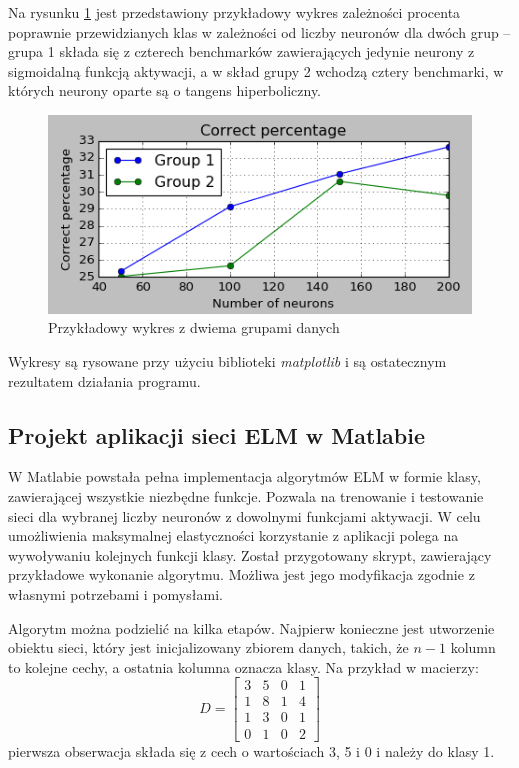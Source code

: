 \documentclass{article}
\begin{document}
Na rysunku \ref{przykladowy} jest przedstawiony przykładowy wykres zależności procenta poprawnie przewidzianych klas w zależności od liczby neuronów dla dwóch grup -- grupa 1 składa się z czterech benchmarków zawierających jedynie neurony z sigmoidalną funkcją aktywacji, a w skład grupy 2 wchodzą cztery benchmarki, w których neurony oparte są o tangens hiperboliczny. 
 
\begin{figure}[H]
\includegraphics[width=\textwidth]{przykladowy_wykres.png}
\caption{Przykładowy wykres z dwiema grupami danych}
\label{przykladowy}
\end{figure}


Wykresy są rysowane przy użyciu biblioteki \textit{matplotlib} i są ostatecznym rezultatem działania programu.

\subsection{Projekt aplikacji sieci ELM w Matlabie}
W Matlabie powstała pełna implementacja algorytmów ELM w formie klasy, zawierającej wszystkie niezbędne funkcje.
Pozwala na trenowanie i testowanie sieci dla wybranej liczby neuronów z dowolnymi funkcjami aktywacji. 
W celu umożliwienia maksymalnej elastyczności korzystanie z aplikacji polega na wywoływaniu kolejnych funkcji klasy.
Został przygotowany skrypt, zawierający przykładowe wykonanie algorytmu.
Możliwa jest jego modyfikacja zgodnie z własnymi potrzebami i pomysłami.

Algorytm można podzielić na kilka etapów.
Najpierw konieczne jest utworzenie obiektu sieci, który jest inicjalizowany zbiorem danych, takich, że $n-1$ kolumn to kolejne cechy, a ostatnia kolumna oznacza klasy.
Na przykład w macierzy:
\[D= \begin{bmatrix} 3&5&0&1 \\ 1&8&1&4 \\ 1&3&0&1 \\ 0&1&0&2 \end{bmatrix}\]
pierwsza obserwacja składa się z cech o wartościach 3, 5 i 0 i należy do klasy 1.
\end{document}
